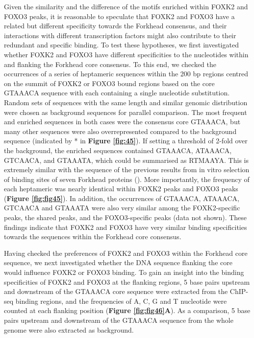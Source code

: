 Given the similarity and the difference of the motifs enriched within FOXK2 and FOXO3 peaks, it is reasonable to speculate that FOXK2 and FOXO3 have a related but different specificity towards the Forkhead consensus, and their interactions with different transcription factors might also contribute to their redundant and specific binding. To test these hypotheses, we first investigated whether FOXK2 and FOXO3 have different specificities to the nucleotides within and flanking the Forkhead core consensus. To this end, we checked the occurrences of a series of heptameric sequences within the 200 bp regions centred on the summit of FOXK2 or FOXO3 bound regions based on the core GTAAACA sequence with each containing a single nucleotide substitution. Random sets of sequences with the same length and similar genomic distribution were chosen as background sequences for parallel comparison. The most frequent and enriched sequences in both cases were the consensus core GTAAACA, but many other sequences were also overrepresented compared to the background sequence (indicated by * in \textbf{Figure \ref{fig:45}}). If setting a threshold of 2-fold over the background, the enriched sequences contained GTAAACA, ATAAACA, GTCAACA, and GTAAATA, which could be summarised as RTMAAYA. This is extremely similar with the sequence of the previous results from in vitro selection of binding sites of seven Forkhead proteins (\cite{pierrou1994cloning}). More importantly, the frequency of each heptameric was nearly identical within FOXK2 peaks and FOXO3 peaks (\textbf{Figure \ref{fig:fig45}}). In addition, the occurrences of GTAAACA, ATAAACA, GTCAACA and GTAAATA were also very similar among the FOXK2-specific peaks, the shared peaks, and the FOXO3-specific peaks (data not shown). These findings indicate that FOXK2 and FOXO3 have very similar binding specificities towards the sequences within the Forkhead core consensus.

Having checked the preferences of FOXK2 and FOXO3 within the Forkhead core sequence, we next investigated whether the DNA sequence flanking the core would influence FOXK2 or FOXO3 binding. To gain an insight into the binding specificities of FOXK2 and FOXO3 at the flanking regions, 5 base pairs upstream and downstream of the GTAAACA core sequence were extracted from the ChIP-seq binding regions, and the frequencies of A, C, G and T nucleotide were counted at each flanking position (\textbf{Figure \ref{fig:fig46}A}). As a comparison, 5 base pairs upstream and downstream of the GTAAACA sequence from the whole genome were also extracted as background.

